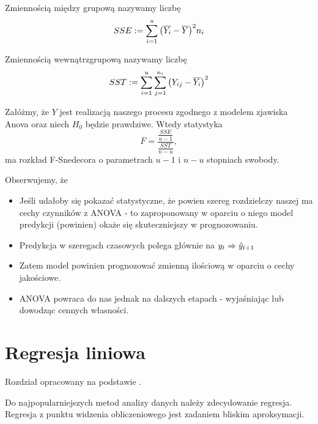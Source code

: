 \documentclass[10pt,a4paper]{book}
\begin{document}
\begin{definition}
Zmiennością między grupową nazywamy liczbę
$$
SSE := \sum_{i=1}^{u} \bracket{\mean{Y_i} - \mean{Y}}^2 n_i 
$$
\end{definition}

\begin{definition}
Zmiennością wewnątrzgrupową nazywamy liczbę
$$
SST := \sum_{i=1}^{u}  \sum_{j=1}^{n_i} \bracket{Y_{ij} - \mean{Y_i}}^2  
$$
\end{definition}

\begin{theorem}
Załóżmy, że $Y$ jest realizacją naszego procesu zgodnego z modelem zjawiska Anova oraz niech $H_0$ będzie prawdziwe. Wtedy statystyka
$$
F = \frac{\frac{SSE}{u-1}}{\frac{SST}{n-u}},
$$
ma rozkład F-Snedecora o parametrach $u-1$ i $n-u$ stopniach swobody.
\end{theorem}

Obserwujemy, że
\begin{itemize}
\item Jeśli udałoby się pokazać statystyczne, że powien szereg rozdzielczy naszej ma cechy czynników z ANOVA - to zaproponowany w oparciu o niego model predykcji (powinien) okaże się skuteczniejszy w prognozowaniu.
\item Predykcja w szeregach czasowych polega głównie na $y_t \Rightarrow \predict{y}{t+1}$
\item Zatem model powinien prognozować zmienną ilościową w oparciu o cechy jakościowe.
\item ANOVA powraca do nas jednak na dalszych etapach - wyjaśniając lub dowodząc cennych własności.
\end{itemize}

\section{Regresja liniowa}

Rozdział opracowany na podstawie \cite{montgomery2015introduction}.

Do najpopularniejszych metod analizy danych należy zdecydowanie regresja. Regresja z punktu widzenia obliczeniowego jest zadaniem bliskim aproksymacji.
\end{document}
